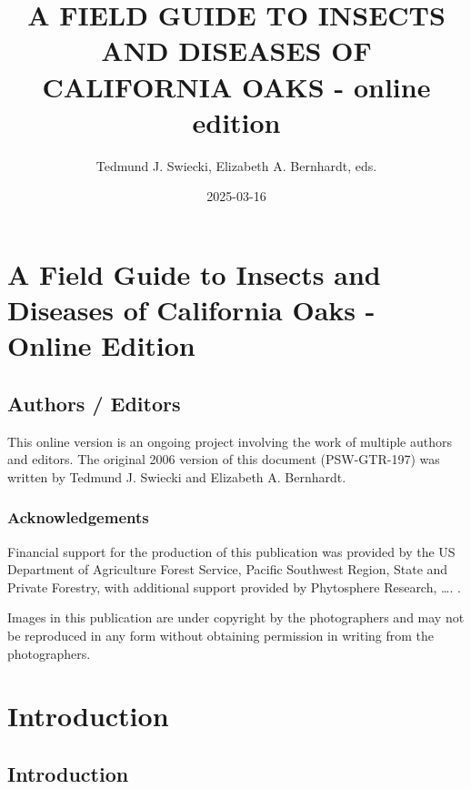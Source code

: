 \documentclass[
]{book}
\title{A FIELD GUIDE TO INSECTS AND DISEASES OF CALIFORNIA OAKS - online edition}
\author{Tedmund J. Swiecki, Elizabeth A. Bernhardt, eds.}
\date{2025-03-16}
\begin{document}
\maketitle

{
\setcounter{tocdepth}{1}
\tableofcontents
}
\part*{A Field Guide to Insects and Diseases of California Oaks - Online Edition}\label{part-a-field-guide-to-insects-and-diseases-of-california-oaks---online-edition}

\chapter*{Authors / Editors}\label{authors-editors}

This online version is an ongoing project involving the work of multiple authors and editors. The original 2006 version of this document (PSW-GTR-197) was written by Tedmund J. Swiecki and Elizabeth A. Bernhardt.

\section*{Acknowledgements}\label{acknowledgements}

Financial support for the production of this publication was provided by the US Department of Agriculture Forest Service, Pacific Southwest Region, State and Private Forestry, with additional support provided by Phytosphere Research, \ldots. .

Images in this publication are under copyright by the photographers and may not be reproduced in any form without obtaining permission in writing from the photographers.

\part*{Introduction}\label{part-introduction}

\chapter*{Introduction}\label{introduction}
\end{document}
